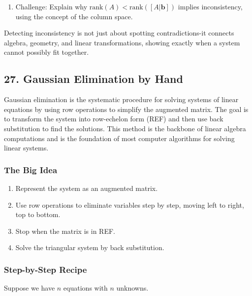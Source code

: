 \documentclass[
  letterpaper,
  DIV=11,
  numbers=noendperiod]{scrreprt}
\providecommand{\tightlist}{%
  \setlength{\itemsep}{0pt}\setlength{\parskip}{0pt}}
\begin{document}
\begin{enumerate}
\def\labelenumi{\arabic{enumi}.}
\setcounter{enumi}{3}
\tightlist
\item
  Challenge: Explain why
  \(\text{rank}(A) < \text{rank}([A|\mathbf{b}])\) implies
  inconsistency, using the concept of the column space.
\end{enumerate}

Detecting inconsistency is not just about spotting contradictions-it
connects algebra, geometry, and linear transformations, showing exactly
when a system cannot possibly fit together.

\subsection{27. Gaussian Elimination by
Hand}\label{gaussian-elimination-by-hand}

Gaussian elimination is the systematic procedure for solving systems of
linear equations by using row operations to simplify the augmented
matrix. The goal is to transform the system into row-echelon form (REF)
and then use back substitution to find the solutions. This method is the
backbone of linear algebra computations and is the foundation of most
computer algorithms for solving linear systems.

\subsubsection{The Big Idea}\label{the-big-idea}

\begin{enumerate}
\def\labelenumi{\arabic{enumi}.}
\tightlist
\item
  Represent the system as an augmented matrix.
\item
  Use row operations to eliminate variables step by step, moving left to
  right, top to bottom.
\item
  Stop when the matrix is in REF.
\item
  Solve the triangular system by back substitution.
\end{enumerate}

\subsubsection{Step-by-Step Recipe}\label{step-by-step-recipe}

Suppose we have \(n\) equations with \(n\) unknowns.
\end{document}
